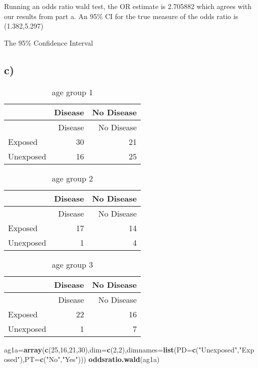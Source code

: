 \documentclass[]{article}
\newenvironment{Shaded}{\begin{snugshade}}{\end{snugshade}}
\newcommand{\KeywordTok}[1]{\textcolor[rgb]{0.13,0.29,0.53}{\textbf{#1}}}
\newcommand{\DataTypeTok}[1]{\textcolor[rgb]{0.13,0.29,0.53}{#1}}
\newcommand{\DecValTok}[1]{\textcolor[rgb]{0.00,0.00,0.81}{#1}}
\newcommand{\StringTok}[1]{\textcolor[rgb]{0.31,0.60,0.02}{#1}}
\newcommand{\NormalTok}[1]{#1}
\begin{document}
Running an odds ratio wald test, the OR estimate is 2.705882 which
agrees with our results from part a. An 95\% CI for the true measure of
the odds ratio is (1.382,5.297)

The 95\% Confidence Interval

\subsection{c)}\label{c-1}

\begin{longtable}[]{@{}lrr@{}}
\caption{age group 1}\tabularnewline
\toprule
& Disease & No Disease\tabularnewline
\midrule
\endfirsthead
\toprule
& Disease & No Disease\tabularnewline
\midrule
\endhead
Exposed & 30 & 21\tabularnewline
Unexposed & 16 & 25\tabularnewline
\bottomrule
\end{longtable}

\begin{longtable}[]{@{}lrr@{}}
\caption{age group 2}\tabularnewline
\toprule
& Disease & No Disease\tabularnewline
\midrule
\endfirsthead
\toprule
& Disease & No Disease\tabularnewline
\midrule
\endhead
Exposed & 17 & 14\tabularnewline
Unexposed & 1 & 4\tabularnewline
\bottomrule
\end{longtable}

\begin{longtable}[]{@{}lrr@{}}
\caption{age group 3}\tabularnewline
\toprule
& Disease & No Disease\tabularnewline
\midrule
\endfirsthead
\toprule
& Disease & No Disease\tabularnewline
\midrule
\endhead
Exposed & 22 & 16\tabularnewline
Unexposed & 1 & 7\tabularnewline
\bottomrule
\end{longtable}

\begin{Shaded}
\begin{Highlighting}[]
\NormalTok{ag1a=}\KeywordTok{array}\NormalTok{(}\KeywordTok{c}\NormalTok{(}\DecValTok{25}\NormalTok{,}\DecValTok{16}\NormalTok{,}\DecValTok{21}\NormalTok{,}\DecValTok{30}\NormalTok{),}\DataTypeTok{dim=}\KeywordTok{c}\NormalTok{(}\DecValTok{2}\NormalTok{,}\DecValTok{2}\NormalTok{),}\DataTypeTok{dimnames=}\KeywordTok{list}\NormalTok{(}\DataTypeTok{PD=}\KeywordTok{c}\NormalTok{(}\StringTok{"Unexposed"}\NormalTok{,}\StringTok{"Exposed"}\NormalTok{),}\DataTypeTok{PT=}\KeywordTok{c}\NormalTok{(}\StringTok{"No"}\NormalTok{,}\StringTok{"Yes"}\NormalTok{)))}
\KeywordTok{oddsratio.wald}\NormalTok{(ag1a)}
\end{Highlighting}
\end{Shaded}
\end{document}
